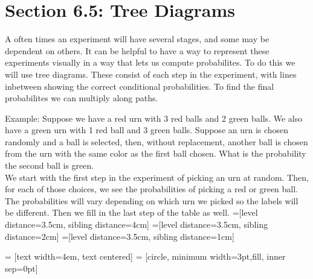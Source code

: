 \documentclass[14,fleqn]{article}
\begin{document}
\section{Section 6.5: Tree Diagrams}

A often times an experiment will have several stages, and some may be dependent on others. It can be helpful to have a way to represent these experiments visually in a way that lets us compute probabilites. To do this we will use tree diagrams. These consist of each step in the experiment, with lines inbetween showing the correct conditional probabilities. To find the final probabilites we can multiply along paths.

Example: Suppose we have a red urn with 3 red balls and 2 green balls. We also have a green urn with 1 red ball and 3 green balls. Suppose an urn is chosen randomly and a ball is selected, then, without replacement, another ball is chosen from the urn with the same color as the first ball chosen. What is the probability the second ball is green.\\

We start with the first step in the experiment of picking an urn at random. Then, for each of those choices, we see the probabilities of picking a red or green ball. The probabilities will vary depending on which urn we picked so the labels will be different. Then we fill in the last step of the table as well.
=[level distance=3.5cm, sibling distance=4cm]
=[level distance=3.5cm, sibling distance=2cm]
=[level distance=3.5cm, sibling distance=1cm]

 = [text width=4em, text centered]
 = [circle, minimum width=3pt,fill, inner sep=0pt]
\end{document}
